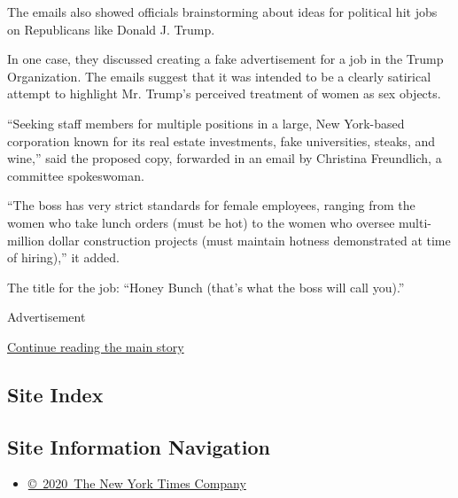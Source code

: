 The emails also showed officials brainstorming about ideas for political
hit jobs on Republicans like Donald J. Trump.

In one case, they discussed creating a fake advertisement for a job in
the Trump Organization. The emails suggest that it was intended to be a
clearly satirical attempt to highlight Mr. Trump's perceived treatment
of women as sex objects.

``Seeking staff members for multiple positions in a large, New
York-based corporation known for its real estate investments, fake
universities, steaks, and wine,'' said the proposed copy, forwarded in
an email by Christina Freundlich, a committee spokeswoman.

``The boss has very strict standards for female employees, ranging from
the women who take lunch orders (must be hot) to the women who oversee
multi-million dollar construction projects (must maintain hotness
demonstrated at time of hiring),'' it added.

The title for the job: ``Honey Bunch (that's what the boss will call
you).''

Advertisement

\protect\hyperlink{after-bottom}{Continue reading the main story}

\hypertarget{site-index}{%
\subsection{Site Index}\label{site-index}}

\hypertarget{site-information-navigation}{%
\subsection{Site Information
Navigation}\label{site-information-navigation}}

\begin{itemize}
\tightlist
\item
  \href{https://help.nytimes.com/hc/en-us/articles/115014792127-Copyright-notice}{©~2020~The
  New York Times Company}
\end{itemize}

